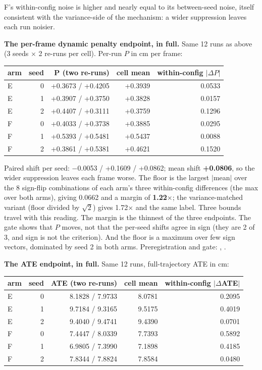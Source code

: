 F's within-config noise is higher and nearly equal to its between-seed noise, itself consistent with the variance-side of the mechanism: a wider suppression leaves each run noisier.

\textbf{The per-frame dynamic penalty endpoint, in full.} Same 12 runs as above (3 seeds $\times$ 2 re-runs per cell). Per-run $P$ in cm per frame:

\begin{table}[t]\centering\scriptsize\setlength{\tabcolsep}{3.5pt}
\begin{tabular}{lrrrr}\toprule
arm & seed & P (two re-runs) & cell mean & within-config $|\Delta P|$ \\ \midrule
E & 0 & +0.3673 / +0.4205 & +0.3939 & 0.0533 \\
E & 1 & +0.3907 / +0.3750 & +0.3828 & 0.0157 \\
E & 2 & +0.4407 / +0.3111 & +0.3759 & 0.1296 \\
F & 0 & +0.4033 / +0.3738 & +0.3885 & 0.0295 \\
F & 1 & +0.5393 / +0.5481 & +0.5437 & 0.0088 \\
F & 2 & +0.3861 / +0.5381 & +0.4621 & 0.1520 \\
\bottomrule\end{tabular}\end{table}

Paired shift per seed: $-$0.0053 / +0.1609 / +0.0862; mean shift \textbf{+0.0806}, so the wider suppression leaves each frame worse. The floor is the largest $|$mean$|$ over the 8 sign-flip combinations of each arm's three within-config differences (the max over both arms), giving 0.0662 and a margin of \textbf{1.22$\times$}; the variance-matched variant (floor divided by $\sqrt{2}$) gives 1.72$\times$ and the same label. Three bounds travel with this reading. The margin is the thinnest of the three endpoints. The gate shows that $P$ moves, not that the per-seed shifts agree in sign (they are 2 of 3, and sign is not the criterion). And the floor is a maximum over few sign vectors, dominated by seed 2 in both arms. Preregistration and gate: , .

\textbf{The ATE endpoint, in full.} Same 12 runs, full-trajectory ATE in cm:

\begin{table}[t]\centering\scriptsize\setlength{\tabcolsep}{3.5pt}
\begin{tabular}{lrrrr}\toprule
arm & seed & ATE (two re-runs) & cell mean & within-config $|\Delta$ATE$|$ \\ \midrule
E & 0 & 8.1828 / 7.9733 & 8.0781 & 0.2095 \\
E & 1 & 9.7184 / 9.3165 & 9.5175 & 0.4019 \\
E & 2 & 9.4040 / 9.4741 & 9.4390 & 0.0701 \\
F & 0 & 7.4447 / 8.0339 & 7.7393 & 0.5892 \\
F & 1 & 6.9805 / 7.3990 & 7.1898 & 0.4185 \\
F & 2 & 7.8344 / 7.8824 & 7.8584 & 0.0480 \\
\bottomrule\end{tabular}\end{table}

